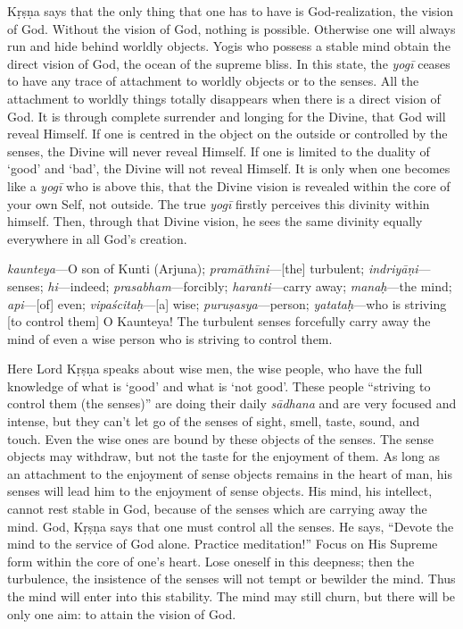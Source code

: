 Kṛṣṇa says that the only thing that one has to have is God-realization, the vision of God. Without the vision of God, nothing is possible. Otherwise one will always run and hide behind worldly objects. Yogis who possess a stable mind obtain the direct vision of God, the ocean of the supreme bliss. In this state, the \textit{yogī} ceases to have any trace of attachment to worldly objects or to the senses. All the attachment to worldly things totally disappears when there is a direct vision of God. It is through complete surrender and longing for the Divine, that God will reveal Himself. If one is centred in the object on the outside or controlled by the senses, the Divine will never reveal Himself. If one is limited to the duality of ‘good’ and ‘bad’, the Divine will not reveal Himself. It is only when one becomes like a \textit{yogī} who is above this, that the Divine vision is revealed within the core of your own Self, not outside. The true \textit{yogī} firstly perceives this divinity within himself. Then, through that Divine vision, he sees the same divinity equally everywhere in all God’s creation.

{%
  \textit{kaunteya}---O son of Kunti (Arjuna); 
  \textit{pramāthīni}---[the] turbulent; 
  \textit{indriyāṇi}---senses; 
  \textit{hi}---indeed; 
  \textit{prasabham}---forcibly; 
  \textit{haranti}---carry away; 
  \textit{manaḥ}---the mind; 
  \textit{api}---[of] even; 
  \textit{vipaścitaḥ}---[a] wise; 
  \textit{puruṣasya}---person; 
  \textit{yatataḥ}---who is striving [to control them]
}
{%
  O Kaunteya! The turbulent senses forcefully carry away the mind of even a wise person who is striving to control them.
}

Here Lord Kṛṣṇa speaks about wise men, the wise people, who have the full knowledge of what is ‘good’ and what is ‘not good’. These people “striving to control them (the senses)” are doing their daily \textit{sādhana} and are very focused and intense, but they can’t let go of the senses of sight, smell, taste, sound, and touch. Even the wise ones are bound by these objects of the senses. The sense objects may withdraw, but not the taste for the enjoyment of them. As long as an attachment to the enjoyment of sense objects remains in the heart of man, his senses will lead him to the enjoyment of sense objects. His mind, his intellect, cannot rest stable in God, because of the senses which are carrying away the mind. God, Kṛṣṇa says that one must control all the senses. He says, “Devote the mind to the service of God alone. Practice meditation!” Focus on His Supreme form within the core of one’s heart. Lose oneself in this deepness; then the turbulence, the insistence of the senses will not tempt or bewilder the mind. Thus the mind will enter into this stability. The mind may still churn, but there will be only one aim: to attain the vision of God.

